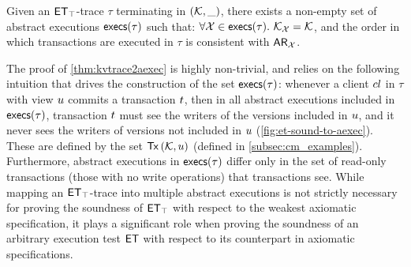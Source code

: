 \begin{theorem}
\label{thm:kvtrace2aexec}
Given an $\mathsf{ET}_{\top}$-trace $\tau$ terminating in $(\mathcal{K}, \_)$, 
there exists a non-empty set of abstract executions $\execs(\tau)$
such that: $\forall \aexec \in \execs(\tau).\ \hh_{\aexec} = \hh$, 
and the order in which transactions are executed in $\tau$ is consistent with $\mathsf{AR}_{\mathcal{X}}$. 
\end{theorem}
\noindent 
The proof of \cref{thm:kvtrace2aexec} is highly
non-trivial, and relies on the following intuition that drives the construction of the set $\execs(\tau)$: 
whenever a client ${cl}$ in $\tau$  with view $u$ commits a transaction $t$, then in all 
abstract executions included in $\execs(\tau)$, transaction $t$ must see the writers  
of the versions included in $u$, and it never sees the writers of versions not included in $u$ (\cref{fig:et-sound-to-aexec}). 
These are defined by the set $\Tx[\hh, \vi]$ (defined in \cref{subsec:cm_examples}). Furthermore, 
abstract executions in $\execs(\tau)$ differ only in the set of read-only transactions (\ie those with no write operations) 
that transactions see. While mapping an $\mathsf{ET}_{\top}$-trace into multiple abstract executions is 
not strictly necessary for proving the soundness of $\mathsf{ET}_{\top}$ with respect 
to the weakest axiomatic specification, it plays a significant role when proving the soundness 
of an arbitrary execution test $\mathsf{ET}$ with respect to its counterpart in axiomatic specifications. 

